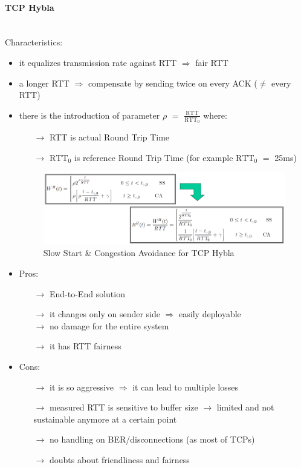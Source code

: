 \paragraph{TCP Hybla}\mbox{}\\[0.2cm]
Characteristics:
\begin{itemize}
    \item it equalizes transmission rate against RTT $\Rightarrow$ fair RTT
    \item a longer RTT $\Rightarrow$ compensate by sending twice on every ACK
    ($\neq$ every RTT)
    \item there is the introduction of parameter $\rho$ $=$
    $\frac{\text{RTT}}{\text{RTT}_\text{0}}$ where:
    \begin{itemize}
        \item[$\rightarrow$] RTT is actual Round Trip Time
        \item[$\rightarrow$] $\text{RTT}_\text{0}$ is reference Round Trip Time (for example
        $\text{RTT}_\text{0}$ $=$ 25ms)
    \end{itemize}
    \begin{figure}[!h] 
        \centering 
        \includegraphics[scale = 0.3]{images/ss-ca-hybla.png} 
        \caption{Slow Start \& Congestion Avoidance for TCP Hybla}
        \label{ss-ca-hybla}
    \end{figure}
    \item Pros:
    \begin{itemize}
        \item[$\rightarrow$] End-to-End solution
        \item[$\rightarrow$] it changes only on sender side $\Rightarrow$ easily deployable\\
        $\rightarrow$ no damage for the entire system 
        \item[$\rightarrow$] it has RTT fairness
    \end{itemize}
    \item Cons:
    \begin{itemize}
        \item[$\rightarrow$] it is so aggressive $\Rightarrow$ it can lead to multiple losses
        \item[$\rightarrow$] measured RTT is sensitive to buffer size $\rightarrow$ limited and not sustainable anymore at a certain point
        \item[$\rightarrow$] no handling on BER/disconnections (as most of TCPs)
        \item[$\rightarrow$] doubts about friendliness and fairness
    \end{itemize}
\end{itemize}
